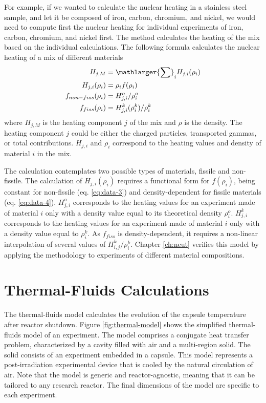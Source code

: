 For example, if we wanted to calculate the nuclear heating in a stainless steel sample, and let it be composed of iron, carbon, chromium, and nickel, we would need to compute first the nuclear heating for individual experiments of iron, carbon, chromium, and nickel first.
The method calculates the heating of the mix based on the individual calculations.
The following formula calculates the nuclear heating of a mix of different materials
\begin{align}
H_{j,M} &= \mathlarger{\sum}_i H_{j,i}(\rho_i)  \label{eq:data-1} \\
H_{j,i}(\rho_i) &= \rho_i f(\rho_i)  \label{eq:data-2} \\
f_{non-fiss}(\rho_i) &= H_{j,i}^o / \rho_i^o  \label{eq:data-3} \\
f_{fiss}(\rho_i) &= H_{j,i}^k(\rho_i^k) / \rho_i^k  \label{eq:data-4}
\end{align}
where $H_{j, M}$ is the heating component $j$ of the mix and $\rho$ is the density.
The heating component $j$ could be either the charged particles, transported gammas, or total contributions.
$H_{j,i}$ and $\rho_i$ correspond to the heating values and density of material $i$ in the mix.

The calculation contemplates two possible types of materials, fissile and non-fissile.
The calculation of $H_{j,i}(\rho_i)$ requires a functional form for $f(\rho_i)$, being constant for non-fissile (eq. \ref{eq:data-3}) and density-dependent for fissile materials (eq. \ref{eq:data-4}).
$H_{j,i}^o$ corresponds to the heating values for an experiment made of material $i$ only with a density value equal to its theoretical density $\rho_i^o$.
$H_{j,i}^k$ corresponds to the heating values for an experiment made of material $i$ only with a density value equal to $\rho_i^k$.
As $f_{fiss}$ is density-dependent, it requires a non-linear interpolation of several values of $H_{i,j}^k/\rho_i^k$.
Chapter \ref{ch:neut} verifies this model by applying the methodology to experiments of different material compositions.


\section{Thermal-Fluids Calculations}
\label{ch3-tf}

The thermal-fluids model calculates the evolution of the capsule temperature after reactor shutdown.
Figure \ref{fig:thermal-model} shows the simplified thermal-fluids model of an experiment.
The model comprises a conjugate heat transfer problem, characterized by a cavity filled with air and a multi-region solid.
The solid consists of an experiment embedded in a capsule.
This model represents a post-irradiation experimental device that is cooled by the natural circulation of air.
Note that the model is generic and reactor-agnostic, meaning that it can be tailored to any research reactor.
The final dimensions of the model are specific to each experiment.

